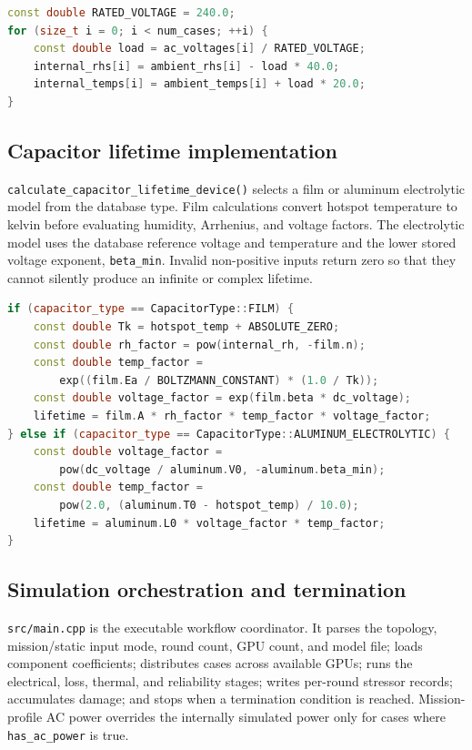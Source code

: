 \documentclass{article}
\begin{document}
\begin{lstlisting}[language=C++,caption={External-to-internal temperature and humidity model}]
const double RATED_VOLTAGE = 240.0;
for (size_t i = 0; i < num_cases; ++i) {
    const double load = ac_voltages[i] / RATED_VOLTAGE;
    internal_rhs[i] = ambient_rhs[i] - load * 40.0;
    internal_temps[i] = ambient_temps[i] + load * 20.0;
}
\end{lstlisting}

\subsection{Capacitor lifetime implementation}
\label{sec:implementation-capacitor-life}
\texttt{calculate\_capacitor\_lifetime\_device()} selects a film or aluminum
electrolytic model from the database type.  Film calculations convert hotspot
temperature to kelvin before evaluating humidity, Arrhenius, and voltage factors.
The electrolytic model uses the database reference voltage and temperature and
the lower stored voltage exponent, \texttt{beta\_min}.  Invalid non-positive
inputs return zero so that they cannot silently produce an infinite or complex
lifetime.

\begin{lstlisting}[language=C++,caption={Capacitor lifetime model selection}]
if (capacitor_type == CapacitorType::FILM) {
    const double Tk = hotspot_temp + ABSOLUTE_ZERO;
    const double rh_factor = pow(internal_rh, -film.n);
    const double temp_factor =
        exp((film.Ea / BOLTZMANN_CONSTANT) * (1.0 / Tk));
    const double voltage_factor = exp(film.beta * dc_voltage);
    lifetime = film.A * rh_factor * temp_factor * voltage_factor;
} else if (capacitor_type == CapacitorType::ALUMINUM_ELECTROLYTIC) {
    const double voltage_factor =
        pow(dc_voltage / aluminum.V0, -aluminum.beta_min);
    const double temp_factor =
        pow(2.0, (aluminum.T0 - hotspot_temp) / 10.0);
    lifetime = aluminum.L0 * voltage_factor * temp_factor;
}
\end{lstlisting}

\subsection{Simulation orchestration and termination}
\label{sec:implementation-orchestration}
\texttt{src/main.cpp} is the executable workflow coordinator.  It parses the
topology, mission/static input mode, round count, GPU count, and model file;
loads component coefficients; distributes cases across available GPUs; runs the
electrical, loss, thermal, and reliability stages; writes per-round stressor
records; accumulates damage; and stops when a termination condition is reached.
Mission-profile AC power overrides the internally simulated power only for cases
where \texttt{has\_ac\_power} is true.
\end{document}
